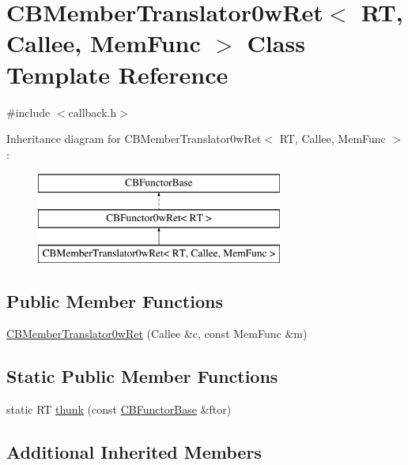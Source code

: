 \hypertarget{class_c_b_member_translator0w_ret}{\section{C\+B\+Member\+Translator0w\+Ret$<$ R\+T, Callee, Mem\+Func $>$ Class Template Reference}
\label{class_c_b_member_translator0w_ret}
}


{\ttfamily \#include $<$callback.\+h$>$}

Inheritance diagram for C\+B\+Member\+Translator0w\+Ret$<$ R\+T, Callee, Mem\+Func $>$\+:\begin{figure}[H]
\begin{center}
\leavevmode
\includegraphics[height=3.000000cm]{class_c_b_member_translator0w_ret}
\end{center}
\end{figure}
\subsection*{Public Member Functions}
\begin{DoxyCompactItemize}
\item 
\hyperlink{class_c_b_member_translator0w_ret_a009f4acc5619fd7cc15e9090eac4a170}{C\+B\+Member\+Translator0w\+Ret} (Callee \&c, const Mem\+Func \&m)
\end{DoxyCompactItemize}
\subsection*{Static Public Member Functions}
\begin{DoxyCompactItemize}
\item 
static R\+T \hyperlink{class_c_b_member_translator0w_ret_a40506f0ca66be1d46686507963391617}{thunk} (const \hyperlink{class_c_b_functor_base}{C\+B\+Functor\+Base} \&ftor)
\end{DoxyCompactItemize}
\subsection*{Additional Inherited Members}


